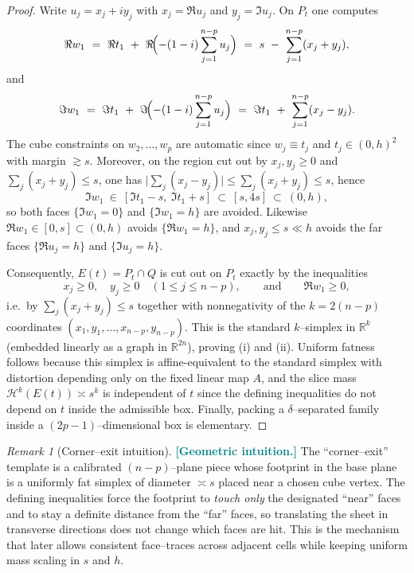 \documentclass[11pt]{article}
\newcommand{\REVMZ}[1]{\textcolor{teal}{#1}}  %
\numberwithin{equation}{section}  %
\theoremstyle{plain}
\theoremstyle{definition}
\theoremstyle{remark}
\newtheorem{remark}[theorem]{Remark}
\newcommand{\R}{\mathbb{R}}
\begin{document}
\begin{proof}
Write $u_j=x_j+i y_j$ with $x_j=\Re u_j$ and $y_j=\Im u_j$.
On $P_t$ one computes
\[
\Re w_1\ =\ \Re t_1\ +\ \Re\!\Bigl(-(1-i)\sum_{j=1}^{n-p}u_j\Bigr)
\ =\ s\ -\ \sum_{j=1}^{n-p}(x_j+y_j),
\]
and
\[
\Im w_1\ =\ \Im t_1\ +\ \Im\!\Bigl(-(1-i)\sum_{j=1}^{n-p}u_j\Bigr)
\ =\ \Im t_1\ +\ \sum_{j=1}^{n-p}(x_j-y_j).
\]
The cube constraints on $w_2,\dots,w_p$ are automatic since $w_j\equiv t_j$ and $t_j\in(0,h)^2$ with margin $\gtrsim s$.
Moreover, on the region cut out by $x_j,y_j\ge 0$ and $\sum_j(x_j+y_j)\le s$, one has
$\bigl|\sum_j(x_j-y_j)\bigr|\le \sum_j(x_j+y_j)\le s$, hence
\[
\Im w_1\ \in\ [\Im t_1-s,\ \Im t_1+s]\ \subset\ [s,4s]\ \subset\ (0,h),
\]
so both faces $\{\Im w_1=0\}$ and $\{\Im w_1=h\}$ are avoided.
Likewise $\Re w_1\in[0,s]\subset(0,h)$ avoids $\{\Re w_1=h\}$, and $x_j,y_j\le s\ll h$ avoids the far faces
$\{\Re u_j=h\}$ and $\{\Im u_j=h\}$.

\smallskip\noindent
Consequently, $E(t)=P_t\cap Q$ is cut out on $P_t$ exactly by the inequalities
\[
x_j\ge 0,\quad y_j\ge 0\quad (1\le j\le n-p),\qquad\text{and}\qquad \Re w_1\ge 0,
\]
i.e.\ by $\sum_j (x_j+y_j)\le s$ together with nonnegativity of the
$k=2(n-p)$ coordinates $(x_1,y_1,\dots,\allowbreak x_{n-p},y_{n-p})$.
This is the standard $k$--simplex in $\R^{k}$ (embedded linearly as a graph in $\R^{2n}$), proving (i) and (ii).
Uniform fatness follows because this simplex is affine-equivalent to the standard simplex with distortion depending only on the fixed linear map $A$,
and the slice mass $\mathcal H^k(E(t))\asymp s^k$ is independent of $t$ since the defining inequalities do not depend on $t$ inside the admissible box.
Finally, packing a $\delta$--separated family inside a $(2p-1)$--dimensional box is elementary.
\end{proof}
\begin{remark}[Corner--exit intuition]\label{rem:corner-exit-intuition}
\REVMZ{\textbf{[Geometric intuition.]}}
The ``corner--exit'' template is a calibrated $(n\!-\!p)$--plane piece whose footprint in the base plane is a uniformly
fat simplex of diameter $\asymp s$ placed near a chosen cube vertex.  The defining inequalities force the footprint to \emph{touch only}
the designated ``near'' faces and to stay a definite distance from the ``far'' faces, so translating the sheet in transverse directions
does not change which faces are hit.  This is the mechanism that later allows consistent face--traces across adjacent cells while keeping
uniform mass scaling in $s$ and $h$.
\end{remark}
\end{document}
